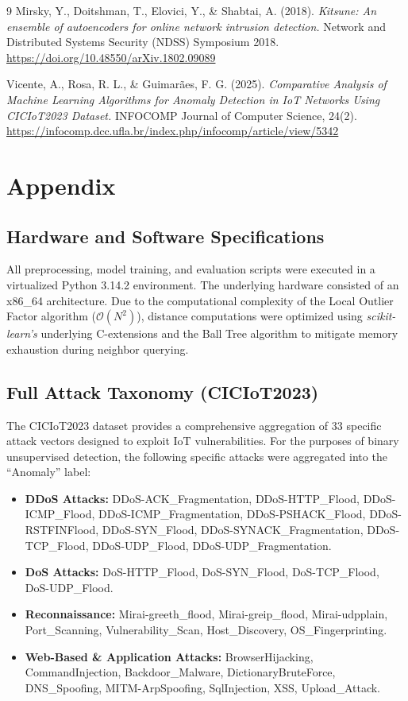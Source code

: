 \documentclass{article}
\begin{document}
\begin{thebibliography}{9}
Mirsky, Y., Doitshman, T., Elovici, Y., \& Shabtai, A. (2018). 
\textit{Kitsune: An ensemble of autoencoders for online network intrusion detection.} 
Network and Distributed Systems Security (NDSS) Symposium 2018. \url{https://doi.org/10.48550/arXiv.1802.09089}

Vicente, A., Rosa, R. L., \& Guimarães, F. G. (2025).
\textit{Comparative Analysis of Machine Learning Algorithms for Anomaly Detection in IoT Networks Using CICIoT2023 Dataset.}
INFOCOMP Journal of Computer Science, 24(2). \url{https://infocomp.dcc.ufla.br/index.php/infocomp/article/view/5342}

\end{thebibliography}

\newpage
\appendix
\section{Appendix}

\subsection{Hardware and Software Specifications}
All preprocessing, model training, and evaluation scripts were executed in a virtualized Python 3.14.2 environment. The underlying hardware consisted of an x86\_64 architecture. Due to the computational complexity of the Local Outlier Factor algorithm ($\mathcal{O}(N^2)$), distance computations were optimized using \textit{scikit-learn's} underlying C-extensions and the Ball Tree algorithm to mitigate memory exhaustion during neighbor querying.

\subsection{Full Attack Taxonomy (CICIoT2023)}
The CICIoT2023 dataset provides a comprehensive aggregation of 33 specific attack vectors designed to exploit IoT vulnerabilities. For the purposes of binary unsupervised detection, the following specific attacks were aggregated into the ``Anomaly'' label:
\begin{itemize}
    \item \textbf{DDoS Attacks:} DDoS-ACK\_Fragmentation, DDoS-HTTP\_Flood, DDoS-ICMP\_Flood, DDoS-ICMP\_Fragmentation, DDoS-PSHACK\_Flood, DDoS-RSTFINFlood, DDoS-SYN\_Flood, DDoS-SYNACK\_Fragmentation, DDoS-TCP\_Flood, DDoS-UDP\_Flood, DDoS-UDP\_Fragmentation.
    \item \textbf{DoS Attacks:} DoS-HTTP\_Flood, DoS-SYN\_Flood, DoS-TCP\_Flood, DoS-UDP\_Flood.
    \item \textbf{Reconnaissance:} Mirai-greeth\_flood, Mirai-greip\_flood, Mirai-udpplain, Port\_Scanning, Vulnerability\_Scan, Host\_Discovery, OS\_Fingerprinting.
    \item \textbf{Web-Based \& Application Attacks:} BrowserHijacking, CommandInjection, Backdoor\_Malware, DictionaryBruteForce, DNS\_Spoofing, MITM-ArpSpoofing, SqlInjection, XSS, Upload\_Attack.
\end{itemize}
\end{document}

